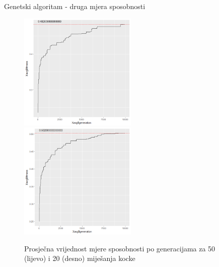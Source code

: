 \documentclass{beamer}
\begin{document}
  \begin{frame}{Genetski algoritam - druga mjera sposobnosti}
  		\begin{figure}[h]
			\centering
			\includegraphics[width=0.5\textwidth]{../../results/cubies_fitness/50_scrambles/cross0,5greedy10mut20.png}
			\includegraphics[width=0.5\textwidth]{../../results/cubies_fitness/20_scrambles/cross0,5greedy10mut20.png}
			\caption{Prosječna vrijednost mjere sposobnosti po generacijama za 50 (lijevo) i 20 (desno) miješanja kocke }
		\end{figure}
  \end{frame}
\end{document}
